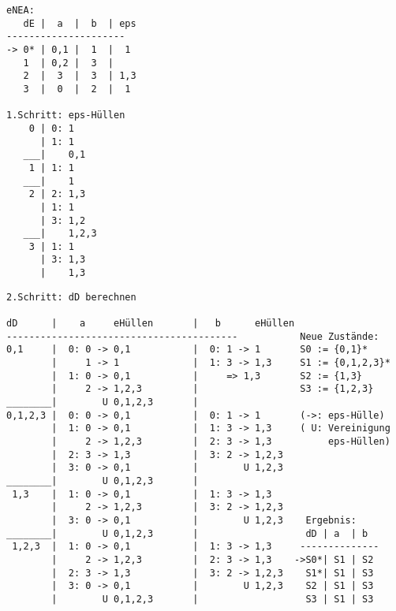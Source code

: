 \documentclass[11pt,
			a4paper,
			parskip=full,
			toc=bib,
			toc=idx,
			toc=listof,
			ngerman
			listof=totoc,]{scrartcl}
\newenvironment{expl}%
{\color{red}}
{\color{black}}
\begin{document}
\begin{expl}


\begin{minipage}[t]{1\linewidth}
  \begin{minipage}[t]{0.3\linewidth}
    \begin{verbatim}
eNEA:
   dE |  a  |  b  | eps
---------------------
-> 0* | 0,1 |  1  |  1
   1  | 0,2 |  3  | 
   2  |  3  |  3  | 1,3
   3  |  0  |  2  |  1

1.Schritt: eps-Hüllen 
    0 | 0: 1
      | 1: 1
   ___|    0,1 
    1 | 1: 1
   ___|    1
    2 | 2: 1,3
      | 1: 1
      | 3: 1,2
   ___|    1,2,3 
    3 | 1: 1
      | 3: 1,3
      |    1,3
    \end{verbatim}
  \end{minipage}
  \begin{minipage}[t]{0.7\linewidth}
    \begin{verbatim}
2.Schritt: dD berechnen

dD      |    a     eHüllen       |   b      eHüllen 
-----------------------------------------           Neue Zustände:
0,1     |  0: 0 -> 0,1           |  0: 1 -> 1       S0 := {0,1}*
        |     1 -> 1             |  1: 3 -> 1,3     S1 := {0,1,2,3}*   
        |  1: 0 -> 0,1           |     => 1,3       S2 := {1,3}
        |     2 -> 1,2,3         |                  S3 := {1,2,3}
________|        U 0,1,2,3       |
0,1,2,3 |  0: 0 -> 0,1           |  0: 1 -> 1       (->: eps-Hülle)
        |  1: 0 -> 0,1           |  1: 3 -> 1,3     ( U: Vereinigung  
        |     2 -> 1,2,3         |  2: 3 -> 1,3          eps-Hüllen)
        |  2: 3 -> 1,3           |  3: 2 -> 1,2,3      
        |  3: 0 -> 0,1           |        U 1,2,3      
________|        U 0,1,2,3       |
 1,3    |  1: 0 -> 0,1           |  1: 3 -> 1,3   
        |     2 -> 1,2,3         |  3: 2 -> 1,2,3 
        |  3: 0 -> 0,1           |        U 1,2,3    Ergebnis:
________|        U 0,1,2,3       |                   dD | a  | b
 1,2,3  |  1: 0 -> 0,1           |  1: 3 -> 1,3     --------------      
        |     2 -> 1,2,3         |  2: 3 -> 1,3    ->S0*| S1 | S2
        |  2: 3 -> 1,3           |  3: 2 -> 1,2,3    S1*| S1 | S3
        |  3: 0 -> 0,1           |        U 1,2,3    S2 | S1 | S3
        |        U 0,1,2,3       |                   S3 | S1 | S3
    \end{verbatim}
  \end{minipage}
\end{minipage}

\end{expl}
\end{document}
